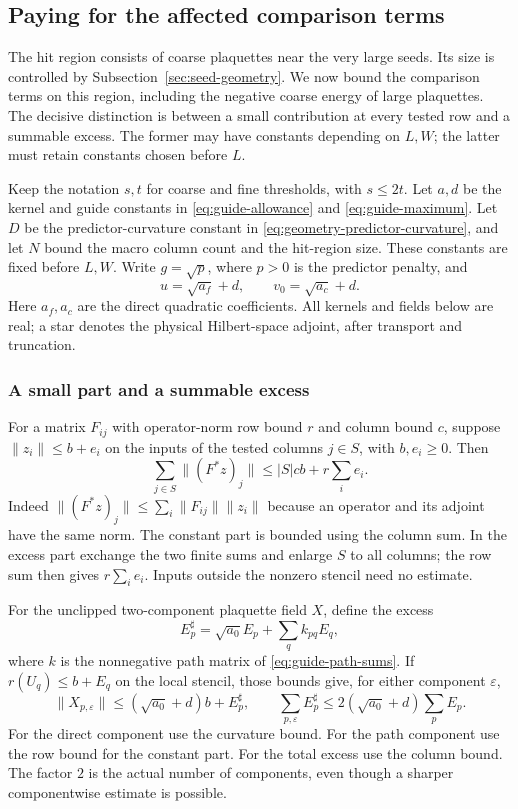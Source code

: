 \subsection{Paying for the affected comparison terms}
\label{sec:seed-hit-comparison}
The hit region consists of coarse plaquettes near the very large
seeds. Its size is controlled by Subsection~\ref{sec:seed-geometry}.
We now bound the comparison terms on this region, including the
negative coarse energy of large plaquettes. The decisive distinction
is between a small contribution at every tested row and a summable
excess. The former may have constants depending on $L,W$; the latter
must retain constants chosen before $L$.

Keep the notation $s,t$ for coarse and fine thresholds, with $s\le2t$.
Let $a,d$ be the kernel and guide constants in
\eqref{eq:guide-allowance} and \eqref{eq:guide-maximum}. Let $D$ be
the predictor-curvature constant in
\eqref{eq:geometry-predictor-curvature}, and let $N$ bound the macro
column count and the hit-region size. These constants are fixed
before $L,W$. Write $g=\sqrt{p}$, where $p>0$ is the predictor
penalty, and
\[
 u=\sqrt{a_f}+d,\qquad v_0=\sqrt{a_c}+d.
\]
Here $a_f,a_c$ are the direct quadratic coefficients. All kernels
and fields below are real; a star denotes the physical Hilbert-space
adjoint, after transport and truncation.

\subsubsection{A small part and a summable excess}
For a matrix $F_{ij}$ with operator-norm row bound $r$ and column
bound $c$, suppose $\|z_i\|\le b+e_i$ on the inputs of the tested
columns $j\in S$, with $b,e_i\ge0$. Then
\begin{equation}\label{eq:hit-transpose}
 \sum_{j\in S}\|(F^*z)_j\|\le |S|cb+r\sum_i e_i.
\end{equation}
Indeed $\|(F^*z)_j\|\le\sum_i\|F_{ij}\|\|z_i\|$ because an
operator and its adjoint have the same norm. The constant part is
bounded using the column sum. In the excess part exchange the two
finite sums and enlarge $S$ to all columns; the row sum then gives
$r\sum_i e_i$. Inputs outside the nonzero stencil need no estimate.

For the unclipped two-component plaquette field $X$, define the excess
\[
 E^\sharp_p=\sqrt{a_0}E_p+\sum_q k_{pq}E_q,
\]
where $k$ is the nonnegative path matrix of
\eqref{eq:guide-path-sums}. If $r(U_q)\le b+E_q$ on the local
stencil, those bounds give, for either component $\varepsilon$,
\begin{equation}\label{eq:hit-plotted}
 \|X_{p,\varepsilon}\|\le(\sqrt{a_0}+d)b+E^\sharp_p,
 \qquad \sum_{p,\varepsilon}E^\sharp_p
        \le2(\sqrt{a_0}+d)\sum_pE_p.
\end{equation}
For the direct component use the curvature bound. For the path
component use the row bound for the constant part. For the total
excess use the column bound. The factor $2$ is the actual number of
components, even though a sharper componentwise estimate is possible.

